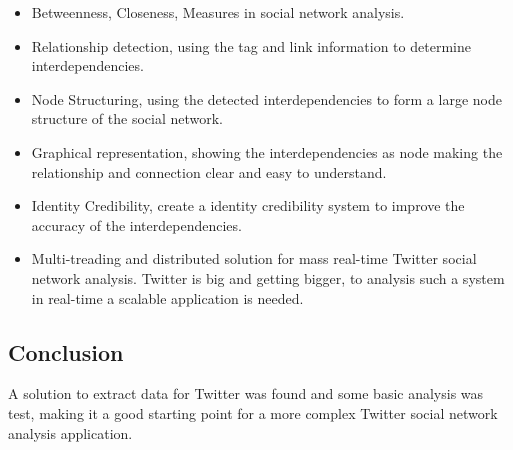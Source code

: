 \documentclass[]{article}  %
\begin{document}
\begin{itemize}
	\item Betweenness, Closeness, Measures in social network analysis.
	\item Relationship detection, using the tag and link information to determine interdependencies.
	\item Node Structuring, using the detected interdependencies to form a large node structure of the social network.
	\item Graphical representation, showing the interdependencies as node making the relationship and connection clear and easy to understand.
	\item Identity Credibility, create a identity credibility system to improve the accuracy of the interdependencies.
	\item Multi-treading and distributed solution for mass real-time Twitter social network analysis. Twitter is big and getting bigger, to analysis such a system in real-time a scalable application is needed.
\end{itemize}

\subsection{Conclusion}

A solution to extract data for Twitter was found and some basic analysis was test, making it a good starting point for a more complex Twitter social network analysis application.

\nocite{bib1} 
\nocite{bib2}
\nocite{bib3}
\nocite{bib4}
\nocite{bib5}
\nocite{bib6}
\nocite{bib7}
\nocite{bib8}
\nocite{bib9}
\nocite{bib10}
\nocite{bib11}
\nocite{bib12}
\nocite{bib13}




\end{document}
